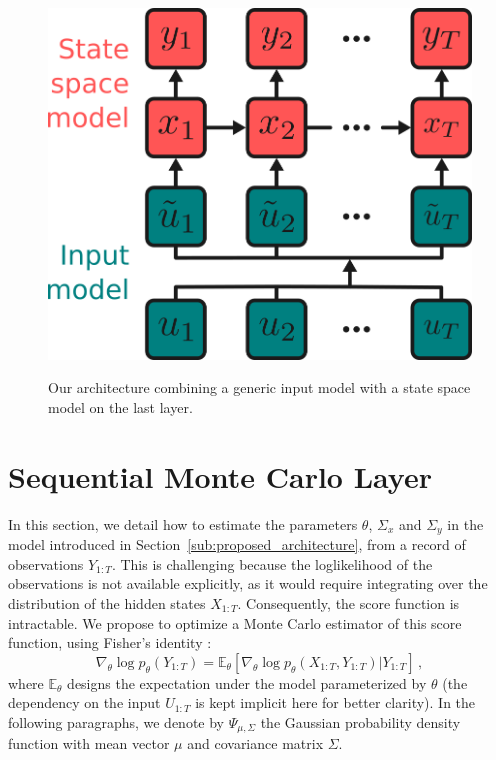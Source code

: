 \documentclass[journal]{IEEEtran}
\begin{document}
\begin{figure}[htpb]
	\centering
	\caption{Our architecture combining a generic input model with a state space model on the last layer.}
	\includegraphics[width=0.7\linewidth]{architecture.png}
	\label{fig:architecture}
\end{figure}

\section{Sequential Monte Carlo Layer}%
\label{sub:uncertainty_estimation}
In this section, we detail how to estimate the parameters $\theta$, $\Sigma_x$ and $\Sigma_y$ in the model introduced in Section~\ref{sub:proposed_architecture}, from a record of observations $Y_{1:T}$.
This is challenging because the loglikelihood of the observations is not available explicitly, as it would require integrating over the distribution of the hidden states $X_{1:T}$.
Consequently, the score function is intractable.
We propose to optimize a Monte Carlo estimator of this score function, using Fisher's identity \cite{monographie-randal}:
\begin{equation}
	\nabla_\theta \log p_\theta(Y_{1:T}) = \mathbb{E}_\theta \left[ \nabla_\theta\log p_\theta(X_{1:T}, Y_{1:T}) | Y_{1:T} \right]\,,
	\label{eq:grad_ll}
\end{equation}
where $\mathbb{E}_\theta$ designs the expectation under the model parameterized by $\theta$ (the dependency on the input $U_{1:T}$ is kept implicit here for better clarity).
In the following paragraphs, we denote by $\Psi_{\mu, \Sigma}$ the Gaussian probability density function with mean vector $\mu$ and covariance matrix $\Sigma$.
\end{document}
